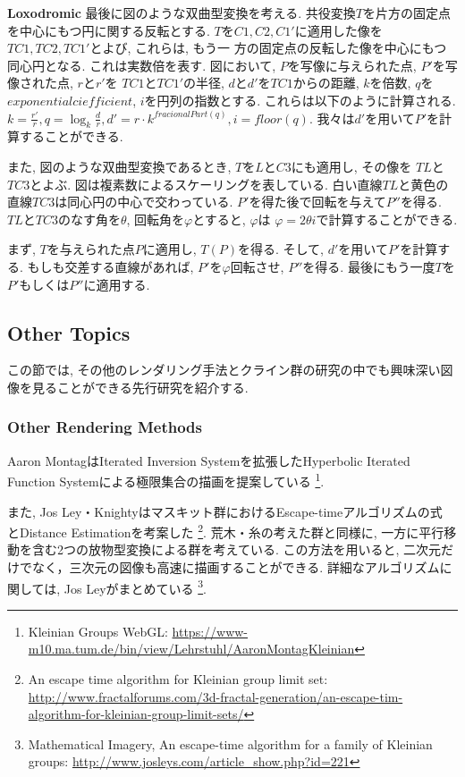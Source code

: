 \noindent\textbf{Loxodromic}
最後に図のような双曲型変換を考える.
共役変換$T$を片方の固定点を中心にもつ円に関する反転とする.
$T$を$C1, C2, C1'$に適用した像を$TC1, TC2, TC1'$とよび, これらは, もう一
方の固定点の反転した像を中心にもつ同心円となる.
これは実数倍を表す.
図において, $P$を写像に与えられた点, $P'$を写像された点, $r$と$r'$を
$TC1$と$TC1'$の半径, $d$と$d'$を$TC1$からの距離, $k$を倍数, $q$を
$exponential ciefficient$,  $i$を円列の指数とする.
これらは以下のように計算される.
 \begin{math}
  k = \frac{r'}{r},
  q = \log_{k} \frac{d}{r},
  d' = r \cdot k^{fracionalPart(q)},
  i = floor(q).
 \end{math}
我々は$d'$を用いて$P'$を計算することができる.

また, 図のような双曲型変換であるとき, $T$を$L$と$C3$にも適用し, その像を
$TL$と$TC3$とよぶ.
図は複素数によるスケーリングを表している.
白い直線$TL$と黄色の直線$TC3$は同心円の中心で交わっている.
$P'$を得た後で回転を与えて$P''$を得る.
$TL$と$TC3$のなす角を$\theta$, 回転角を$\varphi$とすると, $\varphi$は
$\varphi = 2 \theta i$で計算することができる.

まず, $T$を与えられた点$P$に適用し, $T(P)$を得る.
そして, $d'$を用いて$P'$を計算する.
もしも交差する直線があれば, $P'$を$\varphi$回転させ, $P''$を得る.
最後にもう一度$T$を$P'$もしくは$P''$に適用する.

\subsection{Other Topics}

この節では, その他のレンダリング手法とクライン群の研究の中でも興味深い図
像を見ることができる先行研究を紹介する.

\subsubsection{Other Rendering Methods}
Aaron MontagはIterated Inversion Systemを拡張したHyperbolic Iterated
Function Systemによる極限集合の描画を提案している\cite{hyperbolicIFS}
\footnote{Kleinian Groups WebGL:
 \url{https://www-m10.ma.tum.de/bin/view/Lehrstuhl/AaronMontagKleinian}}.

また, Jos Ley・Knightyはマスキット群におけるEscape-timeアルゴリズムの式
とDistance Estimationを考案した
\footnote{An escape time algorithm for Kleinian group limit set:\\ \quad
\quad \url{http://www.fractalforums.com/3d-fractal-generation/an-escape-tim-algorithm-for-kleinian-group-limit-sets/}}.
荒木・糸\cite{maskit}の考えた群と同様に, 一方に平行移動を含む2つの放物型変換による群を考えている.
この方法を用いると, 二次元だけでなく，三次元の図像も高速に描画することができる.
詳細なアルゴリズムに関しては, Jos Leyがまとめている
\footnote{Mathematical Imagery, An escape-time algorithm for a family of
Kleinian groups: \url{http://www.josleys.com/article_show.php?id=221}}.

